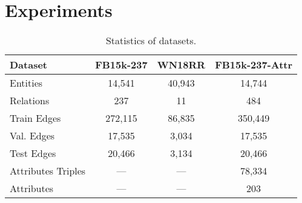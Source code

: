 \documentclass[letterpaper]{article} \usepackage{aaai19}  \usepackage{times}  \usepackage{helvet}  \usepackage{courier}  \usepackage{url}  \usepackage{graphicx}  \usepackage{amsmath}
\begin{document}
\section{Experiments}

\begin{table}[t]
	\caption{Statistics of datasets.}
	\label{tbl:sample}
	\bigskip
	\begin{center}
		\vskip -0.1in
		\setlength{\tabcolsep}{2pt}
		\begin{tabular}{|l|c|c|c|}
\hline
			Dataset & FB15k-237 & WN18RR & FB15k-237-Attr\\
			\hline
Entities	 & 14,541	& 40,943  & 14,744 \\
			Relations	 & 237 & 11 & 484 \\
			Train Edges	 & 272,115 & 86,835 & 350,449 \\
			Val. Edges	 & 17,535 & 3,034 & 17,535 \\
			Test Edges	 & 20,466 & 3,134 & 20,466 \\
			Attributes Triples & --- & --- & 78,334 \\
			Attributes & --- & --- & 203 \\
			\hline
\end{tabular}
	\end{center}
	\vskip -0.25in
\end{table}
\end{document}
